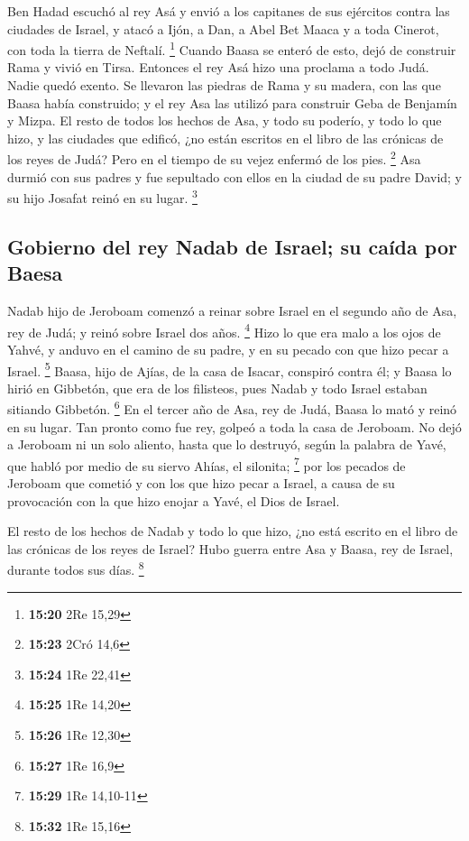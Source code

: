  Ben Hadad escuchó al rey Asá y envió a los capitanes de
sus ejércitos contra las ciudades de Israel, y atacó a Ijón, a Dan, a
Abel Bet Maaca y a toda Cinerot, con toda la tierra de Neftalí.
\footnote{\textbf{15:20} 2Re 15,29}  Cuando Baasa se
enteró de esto, dejó de construir Rama y vivió en Tirsa. 
Entonces el rey Asá hizo una proclama a todo Judá. Nadie quedó exento.
Se llevaron las piedras de Rama y su madera, con las que Baasa había
construido; y el rey Asa las utilizó para construir Geba de Benjamín y
Mizpa.  El resto de todos los hechos de Asa, y todo su
poderío, y todo lo que hizo, y las ciudades que edificó, ¿no están
escritos en el libro de las crónicas de los reyes de Judá? Pero en el
tiempo de su vejez enfermó de los pies. \footnote{\textbf{15:23} 2Cró
  14,6}  Asa durmió con sus padres y fue sepultado con
ellos en la ciudad de su padre David; y su hijo Josafat reinó en su
lugar. \footnote{\textbf{15:24} 1Re 22,41}

\hypertarget{gobierno-del-rey-nadab-de-israel-su-cauxedda-por-baesa}{%
\subsection{Gobierno del rey Nadab de Israel; su caída por
Baesa}\label{gobierno-del-rey-nadab-de-israel-su-cauxedda-por-baesa}}

 Nadab hijo de Jeroboam comenzó a reinar sobre Israel en
el segundo año de Asa, rey de Judá; y reinó sobre Israel dos años.
\footnote{\textbf{15:25} 1Re 14,20}  Hizo lo que era malo
a los ojos de Yahvé, y anduvo en el camino de su padre, y en su pecado
con que hizo pecar a Israel. \footnote{\textbf{15:26} 1Re 12,30}
 Baasa, hijo de Ajías, de la casa de Isacar, conspiró
contra él; y Baasa lo hirió en Gibbetón, que era de los filisteos, pues
Nadab y todo Israel estaban sitiando Gibbetón. \footnote{\textbf{15:27}
  1Re 16,9}  En el tercer año de Asa, rey de Judá, Baasa
lo mató y reinó en su lugar.  Tan pronto como fue rey,
golpeó a toda la casa de Jeroboam. No dejó a Jeroboam ni un solo
aliento, hasta que lo destruyó, según la palabra de Yavé, que habló por
medio de su siervo Ahías, el silonita; \footnote{\textbf{15:29} 1Re
  14,10-11}  por los pecados de Jeroboam que cometió y
con los que hizo pecar a Israel, a causa de su provocación con la que
hizo enojar a Yavé, el Dios de Israel.

 El resto de los hechos de Nadab y todo lo que hizo, ¿no
está escrito en el libro de las crónicas de los reyes de Israel?
 Hubo guerra entre Asa y Baasa, rey de Israel, durante
todos sus días. \footnote{\textbf{15:32} 1Re 15,16}

